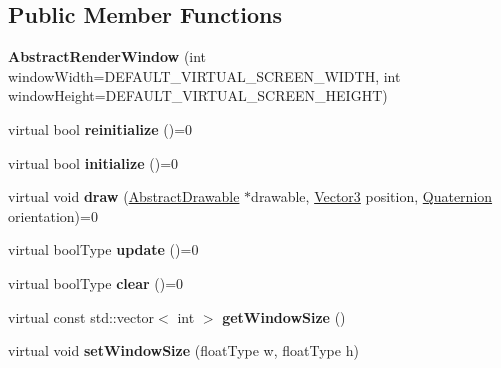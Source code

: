 \subsection*{Public Member Functions}
\begin{DoxyCompactItemize}
\item 
\hypertarget{classAbstractRenderWindow_af6900b9e886bd317fd45d16160d3cfe7}{{\bfseries Abstract\-Render\-Window} (int window\-Width=D\-E\-F\-A\-U\-L\-T\-\_\-\-V\-I\-R\-T\-U\-A\-L\-\_\-\-S\-C\-R\-E\-E\-N\-\_\-\-W\-I\-D\-T\-H, int window\-Height=D\-E\-F\-A\-U\-L\-T\-\_\-\-V\-I\-R\-T\-U\-A\-L\-\_\-\-S\-C\-R\-E\-E\-N\-\_\-\-H\-E\-I\-G\-H\-T)}\label{classAbstractRenderWindow_af6900b9e886bd317fd45d16160d3cfe7}

\item 
\hypertarget{classAbstractRenderWindow_a7618020f62296003484d8ac8f679552f}{virtual bool {\bfseries reinitialize} ()=0}\label{classAbstractRenderWindow_a7618020f62296003484d8ac8f679552f}

\item 
\hypertarget{classAbstractRenderWindow_a4066c9d04fad75533932bfb7ea6824b1}{virtual bool {\bfseries initialize} ()=0}\label{classAbstractRenderWindow_a4066c9d04fad75533932bfb7ea6824b1}

\item 
\hypertarget{classAbstractRenderWindow_a7a66d30711e042f22634906ad82dc271}{virtual void {\bfseries draw} (\hyperlink{classAbstractDrawable}{Abstract\-Drawable} $\ast$drawable, \hyperlink{classVector3}{Vector3} position, \hyperlink{classQuaternion}{Quaternion} orientation)=0}\label{classAbstractRenderWindow_a7a66d30711e042f22634906ad82dc271}

\item 
\hypertarget{classAbstractRenderWindow_ae84cb964db859ffc3f4f738bae8e2b87}{virtual bool\-Type {\bfseries update} ()=0}\label{classAbstractRenderWindow_ae84cb964db859ffc3f4f738bae8e2b87}

\item 
\hypertarget{classAbstractRenderWindow_a647d0764e07f6e8b19261aedf8c39893}{virtual bool\-Type {\bfseries clear} ()=0}\label{classAbstractRenderWindow_a647d0764e07f6e8b19261aedf8c39893}

\item 
\hypertarget{classAbstractRenderWindow_a7307c3893811e1fe0ebe2a39c2731e29}{virtual const std\-::vector$<$ int $>$ {\bfseries get\-Window\-Size} ()}\label{classAbstractRenderWindow_a7307c3893811e1fe0ebe2a39c2731e29}

\item 
\hypertarget{classAbstractRenderWindow_a2c4df802ae30d2353a630d4c516a09d0}{virtual void {\bfseries set\-Window\-Size} (float\-Type w, float\-Type h)}\label{classAbstractRenderWindow_a2c4df802ae30d2353a630d4c516a09d0}


\end{DoxyCompactItemize}
